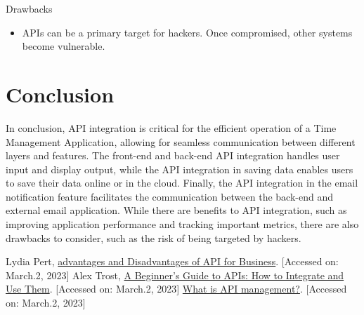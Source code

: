 \documentclass[peerreview]{IEEEtran}
\begin{document}
Drawbacks
\begin{itemize}
  \item APIs can be a primary target for hackers. Once compromised, other systems become vulnerable.
\end{itemize}

\section{Conclusion}

In conclusion, API integration is critical for the efficient operation of a Time Management Application, allowing for seamless communication between different layers and features. The front-end and back-end API integration handles user input and display output, while the API integration in saving data enables users to save their data online or in the cloud. Finally, the API integration in the email notification feature facilitates the communication between the back-end and external email application. While there are benefits to API integration, such as improving application performance and tracking important metrics, there are also drawbacks to consider, such as the risk of being targeted by hackers. 

\begin{thebibliography}{1}
Lydia Pert, \href{https://openvpn.net/blog/advantages-and-disadvantages-of-api-for-business/#:~:text=API%20Disadvantages&text=As%20a%20single%20point%20of,applications%20and%20systems%20become%20vulnerable.}{advantages and Disadvantages of API for Business}. [Accessed on: March.2, 2023]
Alex Trost, \href{https://snipcart.com/blog/integrating-apis-introduction}{A Beginner's Guide to APIs: How to Integrate and Use Them}. [Accessed on: March.2, 2023]
\bibitem{}
\href{https://www.mulesoft.com/resources/api/what-is-api-management#:~:text=API%20management%20is%20the%20process,create%20are%20consumable%20and%20secure.}{What is API management?}. [Accessed on: March.2, 2023]
\end{thebibliography}

\end{document}
